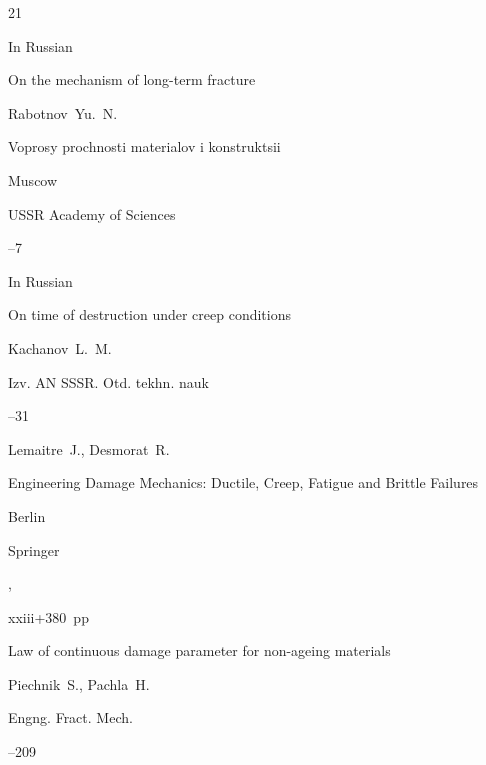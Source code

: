\begin{thebibliography}{21}




\lang In Russian

\paper On the mechanism of long-term fracture

\by Rabotnov~Yu.~N.

\inbook Voprosy prochnosti materialov i konstruktsii

\publaddr Muscow

\publ USSR Academy of Sciences


--7






\lang In Russian

\paper On time of destruction under creep conditions

\by Kachanov~L.~M.

\jour Izv. AN SSSR. Otd. tekhn. nauk



--31




\by Lemaitre~J., Desmorat~R.

\book Engineering Damage Mechanics: Ductile, Creep, Fatigue and Brittle Failures

\publaddr Berlin

\publ Springer

,


xxiii+380~pp





\paper Law of continuous damage parameter for non-ageing materials

\by Piechnik~S., Pachla~H.

\jour  Engng. Fract. Mech.




--209





\end{thebibliography}
